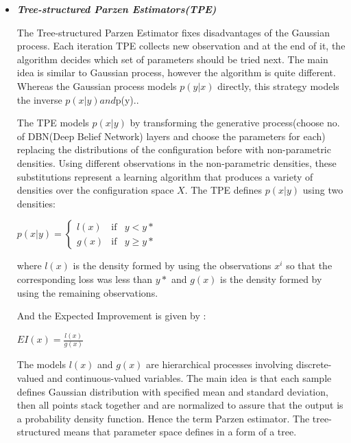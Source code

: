 \documentclass[twoside]{article}
\begin{document}
\begin{itemize}
\item \textit{\textbf{Tree-structured Parzen Estimators(TPE)}}

The Tree-structured Parzen Estimator fixes disadvantages of the Gaussian process. Each iteration TPE collects new observation and at the end of it, the algorithm decides which set of parameters should be tried next. The main idea is similar to Gaussian process, however the algorithm is quite different. Whereas the Gaussian process models $p(y|x)$ directly, this strategy models the inverse $p(x|y) and $p(y).\cite{bergstra2012random}.

The TPE models $p(x|y)$ by transforming the generative process(choose no. of DBN(Deep Belief Network) layers and choose the parameters for each) replacing the distributions of the configuration before with non-parametric densities. Using different observations in the non-parametric densities, these substitutions represent a learning algorithm that produces a variety of densities over the configuration space $X$. 
The TPE defines $p(x|y)$ using two densities:

$p(x|y) = \left\{ \begin{array}{rcl}
l(x) & \mbox{if}
& y<y\ast \\ g(x) & \mbox{if} & y\geq y\ast
\end{array}\right.$

where $l(x)$ is the density formed by using the observations ${x^i}$ so that the corresponding loss was less than $y\ast$ and $g(x)$ is the density formed by using the remaining observations.

And the Expected Improvement is given by :

$EI(x) = \frac{l(x)}{g(x)}$

The models $l(x)$ and $g(x)$ are hierarchical processes involving discrete-valued and continuous-valued variables.\cite{bergstra2012random} 
The main idea is that each sample defines Gaussian distribution with specified mean and standard deviation, then all points stack together and are normalized to assure that the output is a probability density function. Hence the term Parzen estimator. The tree-structured means that parameter space defines in a form of a tree.


\end{itemize}
\end{document}
